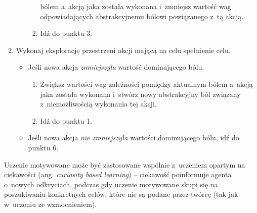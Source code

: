 \begin{enumerate}
\begin{itemize}
\begin{enumerate}
                        bólem a~akcją jaka została wykonana i~zmniejsz wartość 
                        wag odpowiadających abstrakcyjnemu bólowi powiązanego 
                        z~tą akcją.
                    \item Idź do punktu 3.
                \end{enumerate}
        \end{itemize}
    \item Wykonaj eksplorację przestrzeni akcji mającą na celu spełnienie celu.
        \begin{itemize}
            \item Jeśli nowa akcja \textit{zmniejszyła} wartość dominującego bólu.
                \begin{enumerate}
                    \item Zwiększ wartości wag zależności pomiędzy aktualnym 
                        bólem a~akcją jaka została wykonana i~stwórz nowy 
                        abstrakcyjny ból związany z~niemożliwością wykonania 
                        tej akcji.
                    \item Idź do punktu 1.
                \end{enumerate}
            \item Jeśli nowa akcja \textit{nie zmniejszyła} wartości 
                dominującego bólu, idź do punktu 6.
        \end{itemize}
\end{enumerate}

Uczenie motywowane może być zastosowane wspólnie z~uczeniem opartym na 
ciekawości (ang. \textit{curiosity based learning}) -- ciekawość poinformuje 
agenta o~nowych odkryciach, podczas gdy uczenie motywowane skupi się na 
poszukiwaniu konkretnych celów, które nie są podane przez twórcę (tak jak 
w~uczeniu ze wzmocnieniem).

